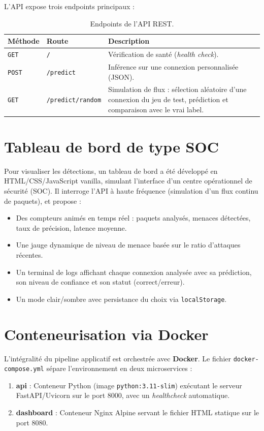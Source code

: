 \documentclass[12pt,a4paper]{report}
\begin{document}
L'API expose trois endpoints principaux :

\begin{table}[H]
    \centering
    \begin{tabularx}{\textwidth}{llX}
        \toprule
        \textbf{Méthode} & \textbf{Route} & \textbf{Description} \\
        \midrule
        \texttt{GET} & \texttt{/} & Vérification de santé (\textit{health check}). \\
        \texttt{POST} & \texttt{/predict} & Inférence sur une connexion personnalisée (JSON). \\
        \texttt{GET} & \texttt{/predict/random} & Simulation de flux : sélection aléatoire d'une connexion du jeu de test, prédiction et comparaison avec le vrai label. \\
        \bottomrule
    \end{tabularx}
    \caption{Endpoints de l'API REST.}
    \label{tab:endpoints}
\end{table}

\section{Tableau de bord de type SOC}

Pour visualiser les détections, un tableau de bord a été développé en HTML/CSS/JavaScript vanilla, simulant l'interface d'un centre opérationnel de sécurité (SOC). Il interroge l'API à haute fréquence (simulation d'un flux continu de paquets), et propose :
\begin{itemize}
    \item Des compteurs animés en temps réel : paquets analysés, menaces détectées, taux de précision, latence moyenne.
    \item Une jauge dynamique de niveau de menace basée sur le ratio d'attaques récentes.
    \item Un terminal de logs affichant chaque connexion analysée avec sa prédiction, son niveau de confiance et son statut (correct/erreur).
    \item Un mode clair/sombre avec persistance du choix via \texttt{localStorage}.
\end{itemize}

\section{Conteneurisation via Docker}

L'intégralité du pipeline applicatif est orchestrée avec \textbf{Docker}. Le fichier \texttt{docker-compose.yml} sépare l'environnement en deux microservices :
\begin{enumerate}
    \item \textbf{api} : Conteneur Python (image \texttt{python:3.11-slim}) exécutant le serveur FastAPI/Uvicorn sur le port 8000, avec un \textit{healthcheck} automatique.
    \item \textbf{dashboard} : Conteneur Nginx Alpine servant le fichier HTML statique sur le port 8080.
\end{enumerate}
\end{document}
